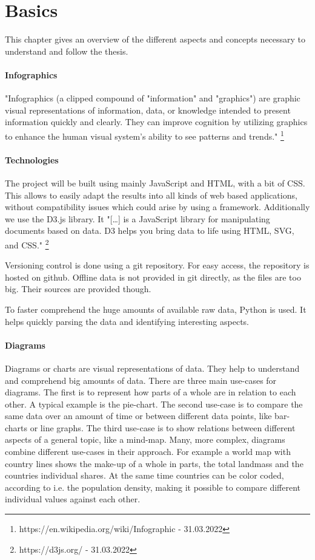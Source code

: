 \documentclass[
a4paper,     %
12pt         %
]{scrartcl}  %
\begin{document}
\section{Basics}
This chapter gives an overview of the different aspects and concepts necessary to understand and follow the thesis.

\paragraph{Infographics}
"Infographics (a clipped compound of "information" and "graphics") are graphic visual representations of information, data, or knowledge intended to present information quickly and clearly. They can improve cognition by utilizing graphics to enhance the human visual system's ability to see patterns and trends." \footnote{https://en.wikipedia.org/wiki/Infographic - 31.03.2022}

\paragraph{Technologies}
The project will be built using mainly JavaScript and HTML, with a bit of CSS. This allows to easily adapt the results into all kinds of web based applications, without compatibility issues which could arise by using a framework. Additionally we use the D3.js library. It "[\dots] is a JavaScript library for manipulating documents based on data. D3 helps you bring data to life using HTML, SVG, and CSS." \footnote{https://d3js.org/ - 31.03.2022}

Versioning control is done using a git repository. For easy access, the repository is hosted on github. Offline data is not provided in git directly, as the files are too big. Their sources are provided though.

To faster comprehend the huge amounts of available raw data, Python is used. It helps quickly parsing the data and identifying interesting aspects.

\paragraph{Diagrams}
Diagrams or charts are visual representations of data. They help to understand and comprehend big amounts of data.
There are three main use-cases for diagrams. The first is to represent how parts of a whole are in relation to each other. A typical example is the pie-chart. The second use-case is to compare the same data over an amount of time or between different data points, like bar-charts or line graphs. The third use-case is to show relations between different aspects of a general topic, like a mind-map.
Many, more complex, diagrams combine different use-cases in their approach. For example a world map with country lines shows the make-up of a whole in parts, the total landmass and the countries individual shares. At the same time countries can be color coded, according to i.e. the population density, making it possible to compare different individual values against each other.
\end{document}
